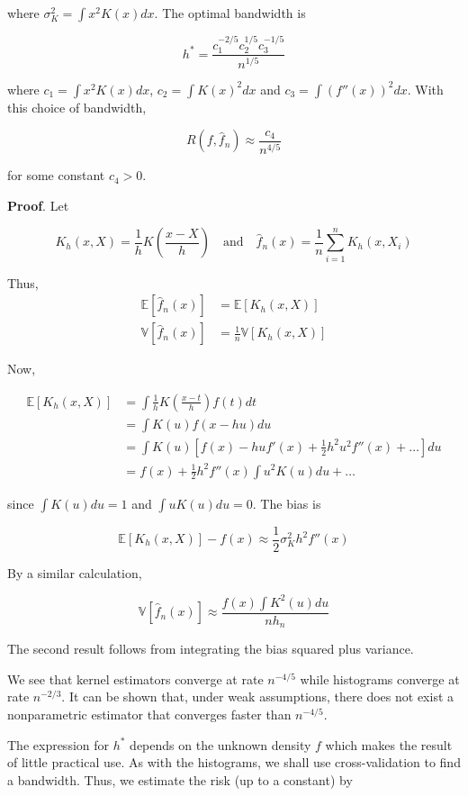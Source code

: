 where \(\sigma_K^{2} = \int x^{2} K(x) dx\). The optimal bandwidth is

\[ h^* = \frac{c_{1}^{-2/5} c_{2}^{1/5} c_{3}^{-1/5}}{n^{1/5}} \]

where \(c_{1} = \int x^{2} K(x) dx\), \(c_{2} = \int K(x)^{2} dx\) and
\(c_{3} = \int \left( f''(x) \right)^{2} dx\). With this choice of
bandwidth,

\[ R(f, \hat{f}_{n}) \approx \frac{c_{4}}{n^{4/5}} \]

for some constant \(c_{4} > 0\).

\textbf{Proof}. Let

\[ K_h(x, X) = \frac{1}{h} K\left( \frac{x - X}{h} \right)
\quad \text{and} \quad
\hat{f}_{n}(x) = \frac{1}{n} \sum_{i=1}^{n} K_h(x, X_{i})
\]

Thus, \begin{align*}
\mathbb{E}[\hat{f}_{n}(x)] &= \mathbb{E}[K_h(x, X)] \\
\mathbb{V}[\hat{f}_{n}(x)] &= \frac{1}{n} \mathbb{V}[K_h(x, X)]
\end{align*}

Now,

\begin{align*}
\mathbb{E}[K_h(x, X)] &= \int \frac{1}{h} K\left( \frac{x - t}{h} \right) f(t) dt \\
&= \int K(u) f(x - hu) du \\
&= \int K(u) \left[ f(x) - hu f'(x) + \frac{1}{2} h^{2}u^{2} f''(x) + \dots \right] du \\
&= f(x) + \frac{1}{2} h^{2} f''(x) \int u^{2} K(u) du + \dots
\end{align*}

since \(\int K(u) du = 1\) and \(\int u K(u) du = 0\). The bias is

\[ \mathbb{E}[K_h(x, X)] - f(x) \approx \frac{1}{2} \sigma_K^{2} h^{2} f''(x) \]

By a similar calculation,

\[ \mathbb{V}[\hat{f}_{n}(x)] \approx \frac{f(x) \int K^{2}(u) du}{n h_{n}} \]

The second result follows from integrating the bias squared plus
variance.

We see that kernel estimators converge at rate \(n^{-4/5}\) while
histograms converge at rate \(n^{-2/3}\). It can be shown that, under
weak assumptions, there does not exist a nonparametric estimator that
converges faster than \(n^{-4/5}\).

The expression for \(h^*\) depends on the unknown density \(f\) which
makes the result of little practical use. As with the histograms, we
shall use cross-validation to find a bandwidth. Thus, we estimate the
risk (up to a constant) by

